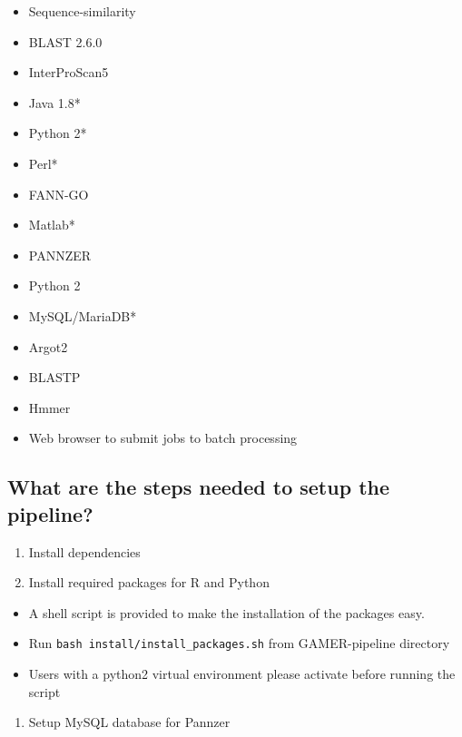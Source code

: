 \documentclass[11pt,letterpaper]{article}
\begin{document}
\begin{itemize}
 \item
       Sequence-similarity
 \item
       BLAST 2.6.0
 \item
       InterProScan5
 \item
       Java 1.8*
 \item
       Python 2*
 \item
       Perl*
 \item
       FANN-GO
 \item
       Matlab*
 \item
       PANNZER
 \item
       Python 2
 \item
       MySQL/MariaDB*
 \item
       Argot2
 \item
       BLASTP
 \item
       Hmmer
 \item
       Web browser to submit jobs to batch processing
\end{itemize}



\subsection{What are the steps needed to setup the pipeline?}\label{what-are-the-steps-needed-to-setup-the-pipeline}

\begin{enumerate}
 \def\labelenumi{\arabic{enumi}.}

 \item
       Install dependencies
 \item
       Install required packages for R and Python
\end{enumerate}

\begin{itemize}

 \item
       A shell script is provided to make the installation of the packages
       easy.
 \item
       Run \texttt{bash\ install/install\_packages.sh} from GAMER-pipeline
       directory
 \item
       Users with a python2 virtual environment please activate before
       running the script
\end{itemize}

\begin{enumerate}
 \def\labelenumi{\arabic{enumi}.}
 \setcounter{enumi}{2}

 \item
       Setup MySQL database for Pannzer
\end{enumerate}
\end{document}
